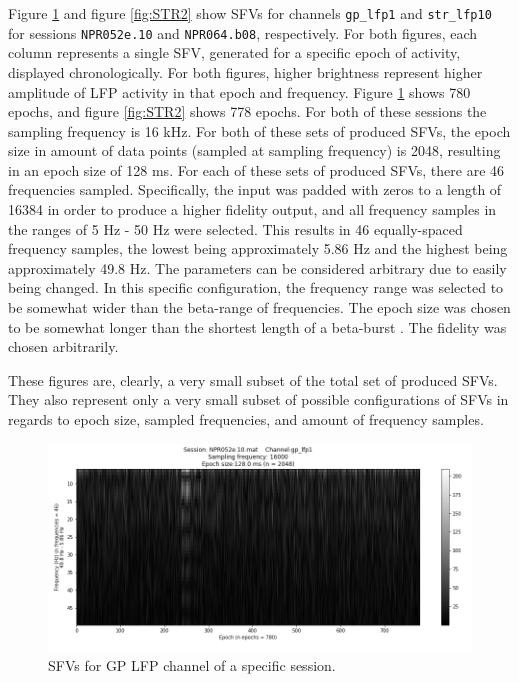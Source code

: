 \documentclass{kththesis}
\begin{document}
Figure \ref{fig:GP1} and figure \ref{fig:STR2} show SFVs for channels \texttt{gp\_lfp1} and \texttt{str\_lfp10} for sessions \texttt{NPR052e.10} and \texttt{NPR064.b08}, respectively. 
For both figures, each column represents a single SFV, generated for a specific epoch of activity, displayed chronologically. 
For both figures, higher brightness represent higher amplitude of LFP activity in that epoch and frequency.
Figure \ref{fig:GP1} shows 780 epochs, and figure \ref{fig:STR2} shows 778 epochs. 
For both of these sessions the sampling frequency is 16 kHz. 
For both of these sets of produced SFVs, the epoch size in amount of data points (sampled at sampling frequency) is 2048, resulting in an epoch size of 128 ms. 
For each of these sets of produced SFVs, there are 46 frequencies sampled. 
Specifically, the input was padded with zeros to a length of 16384 in order to produce a higher fidelity output, and all frequency samples in the ranges of 5 Hz - 50 Hz were selected. 
This results in 46 equally-spaced frequency samples, the lowest being approximately 5.86 Hz and the highest being approximately 49.8 Hz. 
The parameters can be considered arbitrary due to easily being changed.
In this specific configuration, the frequency range was selected to be somewhat wider than the beta-range of frequencies.
The epoch size was chosen to be somewhat longer than the shortest length of a beta-burst \parencite{Cagnan}.
The fidelity was chosen arbitrarily.

These figures are, clearly, a very small subset of the total set of produced SFVs. They also represent only a very small subset of possible configurations of SFVs in regards to epoch size, sampled frequencies, and amount of frequency samples.

\begin{figure}[H]
    \centering
    \centerline{\includegraphics[width=1\textwidth]{images/GP1.png}}
    \caption{SFVs for GP LFP channel of a specific session.}
    \label{fig:GP1}
\end{figure}
\end{document}
